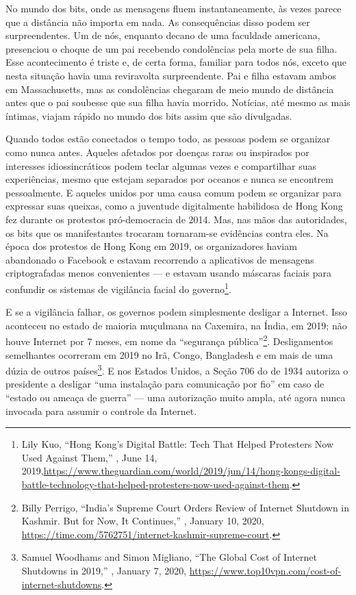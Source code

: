 No mundo dos bits, onde as mensagens fluem instantaneamente, às vezes parece que
a distância não importa em nada. As consequências disso podem ser
surpreendentes. Um de nós, enquanto decano de uma faculdade americana,
presenciou o choque de um pai recebendo condolências pela morte de sua
filha. Esse acontecimento é triste e, de certa forma, familiar para todos nós,
exceto que nesta situação havia uma reviravolta surpreendente. Pai e filha
estavam ambos em Massachusetts, mas as condolências chegaram de meio mundo de
distância antes que o pai soubesse que sua filha havia morrido. Notícias, até
mesmo as mais íntimas, viajam rápido no mundo dos bits assim que são divulgadas.

Quando todos estão conectados o tempo todo, as pessoas podem se organizar como
nunca antes. Aqueles afetados por doenças raras ou inspirados por interesses
idiossincráticos podem teclar algumas vezes e compartilhar suas experiências,
mesmo que estejam separados por oceanos e nunca se encontrem pessoalmente. E
aqueles unidos por uma causa comum podem se organizar para expressar suas
queixas, como a juventude digitalmente habilidosa de Hong Kong fez durante os
protestos pró-democracia de 2014. Mas, nas
mãos das autoridades, os bits que os manifestantes trocaram tornaram-se
evidências contra eles. Na época dos protestos de Hong Kong em 2019, os
organizadores haviam abandonado o Facebook e estavam recorrendo a aplicativos de
mensagens criptografadas menos convenientes --- e estavam usando máscaras
faciais para confundir os sistemas de vigilância facial do governo\footnote{Lily
Kuo, ``Hong Kong's Digital Battle: Tech That 
Helped Protesters Now Used Against Them,'' , June 14,
2019,\url{https://www.theguardian.com/world/2019/jun/14/hong-kongs-digital-battle-technology-that-helped-protesters-now-used-against-them}.}.

E se a vigilância falhar, os governos podem simplesmente desligar a
Internet. Isso aconteceu no estado de maioria muçulmana na Caxemira, na Índia,
em 2019; não houve Internet por 7 meses, em nome
da ``segurança pública''\footnote{Billy Perrigo, ``India's Supreme Court Orders
Review of Internet Shutdown in Kashmir. But for Now, It Continues,''
, January 10, 2020,
\url{https://time.com/5762751/internet-kashmir-supreme-court}.}.
Desligamentos semelhantes ocorreram em 2019 no Irã, Congo, Bangladesh e em mais
de uma dúzia de outros países\footnote{Samuel Woodhams and Simon Migliano, ``The
Global Cost of Internet Shutdowns in 2019,'' , January 7,
2020,
\url{https://www.top10vpn.com/cost-of-internet-shutdowns}.}.
 E nos Estados
Unidos, a Seção 706 do  de 1934 autoriza o presidente
a desligar ``uma instalação para comunicação por fio'' em caso de ``estado ou
ameaça de guerra'' --- uma autorização muito ampla, até agora nunca invocada
para assumir o controle da Internet.

